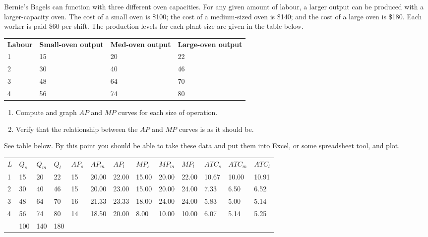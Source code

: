 \begin{enumialphparenastyle}
\begin{ex}\label{ex:ch8ex5}
Bernie's Bagels can function with three different oven capacities. For any given amount of labour, a larger output can be produced with a larger-capacity oven. The cost of a small oven is \$100; the cost of a medium-sized oven is \$140; and the cost of a large oven is \$180. Each worker is paid \$60 per shift. The production levels for each plant size are given in the table below.
\begin{center}
\begin{tabu} to \linewidth {|X[1,c]X[1,c]X[1,c]X[1,c]|}	\hline
{}	\textbf{Labour}	&	\textbf{Small-oven output}	&	\textbf{Med-oven output}	&	\textbf{Large-oven output}	\\
						1	&	15	&	20	&	22	\\
	2	&	30	&	40	&	46	\\
						3	&	48	&	64	&	70	\\
	4	&	56	&	74	&	80	\\	\hline
\end{tabu}
\end{center}
\begin{enumerate}
	\item	Compute and graph $AP$ and $MP$ curves for each size of operation.
	\item	Verify that the relationship between the $AP$ and $MP$ curves is as it should be.
\end{enumerate}
\begin{sol}
	See table below. By this point you should be able to take these data and put them into Excel, or some spreadsheet tool, and plot.
	\begin{center}\small
	\begin{tabu} to \linewidth {|X[0.8,c]X[0.8,c]X[0.8,c]X[0.8,c]X[0.8,c]X[1,c]X[1,c]X[1,c]X[1,c]X[1,c]X[1,c]X[1,c]X[1,c]|}	\hline
		$L$ & $Q_s$ & $Q_m$ & $Q_l$ & $AP_s$ & $AP_m$ & $AP_l$ & $MP_s$ & $MP_m$ & $MP_l$ & $ATC_s$ & $ATC_m$ & $ATC_l$ \\
		1 & 15 & 20 & 22 & 15 & 20.00 & 22.00 & 15.00 & 20.00 & 22.00 & 10.67 & 10.00 & 10.91 \\
		2 & 30 & 40 & 46 & 15 & 20.00 & 23.00 & 15.00 & 20.00 & 24.00 & 7.33 & 6.50 & 6.52 \\
		3 & 48 & 64 & 70 & 16 & 21.33 & 23.33 & 18.00 & 24.00 & 24.00 & 5.83 & 5.00 & 5.14 \\
		4 & 56 & 74 & 80 & 14 & 18.50 & 20.00 & 8.00 & 10.00 & 10.00 & 6.07 & 5.14 & 5.25 \\
		  & 100 & 140 & 180 & & & & & & & & & \\ \hline
	\end{tabu}
	\end{center}
\end{sol}
\end{ex}


\end{enumialphparenastyle}
